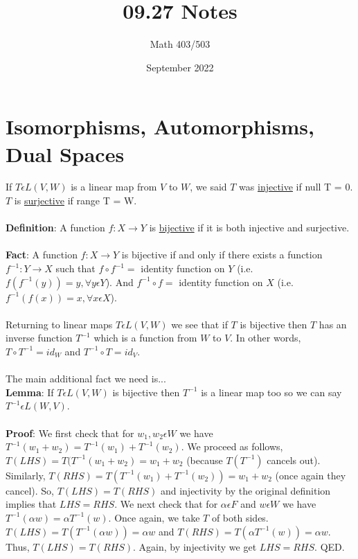 \documentclass{article}
\title{09.27 Notes}
\author{Math 403/503 }
\date{September 2022}
\begin{document}
\maketitle

\section{Isomorphisms, Automorphisms, Dual Spaces}
If $T\epsilon L(V,W)$ is a linear map from $V$ to $W$, we said $T$ was \underline{injective} if null T = 0. $T$ is \underline{surjective} if range T = W. \\\\
\textbf{Definition}: A function $f: X \rightarrow Y$ is \underline{bijective} if it is both injective and surjective. \\\\
\textbf{Fact}: A function $f: X \rightarrow Y$ is bijective if and only if there exists a function $f^{-1}: Y \rightarrow X$ such that $f \circ f^{-1} =$ identity function on $Y$ (i.e. $f(f^{-1}(y))=y,  \forall y \epsilon Y$). And $f^{-1} \circ f=$ identity function on $X$ (i.e. $f^{-1}(f(x)) = x, \forall x \epsilon X$).\\\\
Returning to linear maps $T\epsilon L(V,W)$ we see that if $T$ is bijective then $T$ has an inverse function $T^{-1}$ which is a function from $W$ to $V$. In other words, $T \circ T^{-1} = id_{W}$ and $T^{-1} \circ T = id_{V}$.\\\\
The main additional fact we need is...\\
\textbf{Lemma}: If $T\epsilon L(V,W)$ is bijective then $T^{-1}$ is a linear map too so we can say $T^{-1} \epsilon L(W,V)$.\\\\
\textbf{Proof}: We first check that for $w_1, w_2 \epsilon W$ we have $T^{-1}(w_1 + w_2) = T^{-1}(w_1) + T^{-1}(w_2)$. We proceed as follows, $T(LHS)= T(T^{-1}(w_1 + w_2) = w_1 + w_2$ (because $T(T^{-1})$ cancels out). Similarly, $T(RHS) = T(T^{-1}(w_1) + T^{-1}(w_2)) = w_1 + w_2$ (once again they cancel). So, $T(LHS) = T(RHS)$ and injectivity by the original definition implies that $LHS = RHS$. We next check that for $\alpha \epsilon F$ and $w \epsilon W$ we have $T^{-1}(\alpha w) = \alpha T^{-1}(w)$. Once again, we take $T$ of both sides. $T(LHS) = T(T^{-1}(\alpha w)) = \alpha w$ and $T(RHS) = T(\alpha T^{-1}(w)) = \alpha w$. Thus, $T(LHS) = T(RHS)$. Again, by injectivity we get $LHS = RHS$. QED. \\\\
\end{document}

